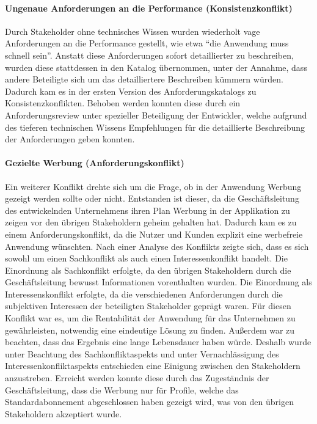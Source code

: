\paragraph{Ungenaue Anforderungen an die Performance (Konsistenzkonflikt)}
Durch Stakeholder ohne technisches Wissen wurden wiederholt vage Anforderungen an die Performance gestellt, wie etwa
\enquote{die Anwendung muss schnell sein}.
Anstatt diese Anforderungen sofort detaillierter zu beschreiben, wurden diese stattdessen in den Katalog übernommen, unter
der Annahme, dass andere Beteiligte sich um das detailliertere Beschreiben kümmern würden.
Dadurch kam es in der ersten Version des Anforderungskatalogs zu Konsistenzkonflikten.
Behoben werden konnten diese durch ein Anforderungsreview unter spezieller Beteiligung der Entwickler, welche aufgrund des
tieferen technischen Wissens Empfehlungen für die detaillierte Beschreibung der Anforderungen geben konnten.

\paragraph{Gezielte Werbung (Anforderungskonflikt)}
Ein weiterer Konflikt drehte sich um die Frage, ob in der Anwendung Werbung gezeigt werden sollte oder nicht.
Entstanden ist dieser, da die Geschäftsleitung des entwickelnden Unternehmens ihren Plan Werbung in der Applikation zu zeigen
vor den übrigen Stakeholdern geheim gehalten hat.
Dadurch kam es zu einem Anforderungskonflikt, da die Nutzer und Kunden explizit eine werbefreie Anwendung wünschten.
Nach einer Analyse des Konflikts zeigte sich, dass es sich sowohl um einen Sachkonflikt als auch einen Interessenkonflikt
handelt.
Die Einordnung als Sachkonflikt erfolgte, da den übrigen Stakeholdern durch die Geschäftsleitung bewusst Informationen
vorenthalten wurden.
Die Einordnung als Interessenskonflikt erfolgte, da die verschiedenen Anforderungen durch die subjektiven Interessen der
beteiligten Stakeholder geprägt waren.
Für diesen Konflikt war es, um die Rentabilität der Anwendung für das Unternehmen zu gewährleisten, notwendig eine eindeutige
Lösung zu finden.
Außerdem war zu beachten, dass das Ergebnis eine lange Lebensdauer haben würde.
Deshalb wurde unter Beachtung des Sachkonfliktaspekts und unter Vernachlässigung des Interessenkonfliktaspekts entschieden
eine Einigung zwischen den Stakeholdern anzustreben.
Erreicht werden konnte diese durch das Zugeständnis der Geschäftsleitung, dass die Werbung nur für Profile, welche das Standardabonnement
abgeschlossen haben gezeigt wird, was von den übrigen Stakeholdern akzeptiert wurde.

